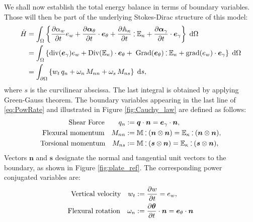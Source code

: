 \documentclass[11pt]{article}
\def\onedot{$\mathsurround0pt\ldotp$}
\def\cddot{%
	\mathbin{\vcenter{\baselineskip.67ex
			\hbox{\onedot}\hbox{\onedot}}%
}}
\begin{document}
	{
		We shall now establish the total energy balance in terms of boundary variables. Those will then be part of the underlying Stokes-Dirac structure of this model:
		\begin{equation}
		\label{eq:PowRate}
		\begin{aligned}
		\dot{H}&= \int_{\Omega} \left\{ \diffp{\alpha_w}{t} e_w  + \diffp{\bm\alpha_\theta}{t} \cdot \bm{e}_\theta + \diffp{\mathbb{A}_{\kappa}}{t} \cddot \mathbb{E}_{\kappa}  + \diffp{\bm\alpha_{\gamma}}{t} \cdot \bm{e}_{\gamma} \right\} \d\Omega\\
		&= \int_{\Omega} \left\{ \mathrm{div}(\bm{e}_{\gamma}) e_w  + \mathrm{Div}(\mathbb{E}_{\kappa}) \cdot \bm{e}_\theta + \; \mathrm{Grad}(\bm{e}_{\theta}) \cddot \mathbb{E}_{\kappa}  + \mathrm{grad} (e_w) \cdot \bm{e}_{\gamma} \right\} \d\Omega \\
		&= \int_{\partial \Omega} \left\{ w_t \, q_n  + \omega_n \, M_{nn} + \omega_s \, M_{ns} \right\} \d{s},  \\
		\end{aligned}
		\end{equation}
		where $s$ is the curvilinear abscissa. The last integral is obtained by applying Green-Gauss theorem. The boundary variables appearing in the last line of \eqref{eq:PowRate} and illustrated in Figure \ref{fig:Cauchy_law} are defined as follows:
		\begin{equation}
		\label{eq:QnMnnMns}
		\begin{aligned}
		\text{Shear Force}  \qquad q_{n} &:= \bm{q} \cdot \bm{n}=  \bm{e}_{\gamma} \cdot \bm{n},  \\
		\text{Flexural momentum} \quad 
		M_{nn} &:=  \mathbb{M} \cddot (\bm{n}\otimes{\bm{n}}) = \mathbb{E}_{\kappa} \cddot (\bm{n}\otimes{\bm{n}}) 	\\
		\text{Torsional momentum} \quad M_{ns} &:= \mathbb{M} \cddot (\bm{s}\otimes{\bm{n}}) = \mathbb{E}_{\kappa} \cddot (\bm{s}\otimes{\bm{n}}),	
		\end{aligned},
		\end{equation}
		Vectors $\bm{n}$ and $\bm{s}$ designate the normal and tangential unit vectors to the boundary, as shown in Figure \ref{fig:plate_ref}. The corresponding power conjugated variables are:
		\begin{equation}
		\label{eq:wtwnws}
		\begin{aligned}
		\text{Vertical velocity}  \quad w_t &:= \diffp{w}{t} = e_w, \\
		\text{Flexural rotation} \quad 
		\omega_{n} &:= \diffp{\bm{\theta}}{t} \cdot \bm{n} = \bm{e}_\theta \cdot \bm{n} \\

\end{aligned}
\end{equation}}
\end{document}
